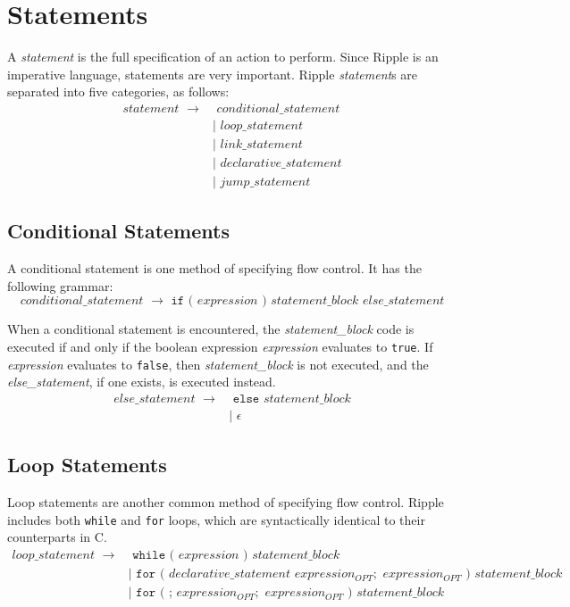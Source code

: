 \documentclass{article}
\newcommand{\code}{\texttt}
\begin{document}
\section{Statements}
A \emph{statement} is the full specification of an action to perform. Since Ripple is an imperative language, statements are very important. Ripple \emph{statement}s are separated into five categories, as follows:
\begin{align*}
statement\,\,\rightarrow&  \,\,conditional\_statement \\
                        &| \,\,loop\_statement        \\
                        &| \,\,link\_statement        \\
                        &| \,\,declarative\_statement \\
                        &| \,\,jump\_statement
\end{align*}

\subsection{Conditional Statements}
A conditional statement is one method of specifying flow control. It has the following grammar:
\[ conditional\_statement\,\,\rightarrow\,\,\code{if}\,\,\code{(}\,\,expression\,\,\code{)}\,\, statement\_block\,\,else\_statement \]

When a conditional statement is encountered, the \emph{statement\_block} code is executed if and only if the boolean expression \emph{expression} evaluates to \code{true}. If \emph{expression} evaluates to \code{false}, then \emph{statement\_block} is not executed, and the \emph{else\_statement}, if one exists, is executed instead.
\begin{align*}
else\_statement\,\,\rightarrow&  \,\,\code{else}\,\,statement\_block\\
                              &| \,\,\epsilon
\end{align*}

\subsection{Loop Statements}
Loop statements are another common method of specifying flow control. Ripple includes both \code{while} and \code{for} loops, which are syntactically identical to their counterparts in C.
\begin{align*}
loop\_statement\,\,\rightarrow&\,\,\code{while}\,\,\code{(}\,\,expression\,\,\code{)}\,\,statement\_block\\
&|\,\,\code{for}\,\,\code{(}\,\,declarative\_statement\,\,expression_{OPT};\,\,expression_{OPT}\,\,\code{)}\,\,statement\_block\\
& |\,\,\code{for}\,\,\code{(}\,\,\code{;}\,\,expression_{OPT};\,\,expression_{OPT}\,\,\code{)}\,\,statement\_block
\end{align*}
\end{document}
